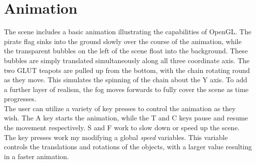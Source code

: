 \documentclass[]{article}
\begin{document}
\section*{Animation}

The scene includes a basic animation illustrating the capabilities of OpenGL. The pirate flag sinks into the ground slowly over the course of the animation, while the transparent bubbles on the left of the scene float into the background. These bubbles are simply translated simultaneously along all three coordinate axis. The two GLUT teapots are pulled up from the bottom, with the chain rotating round as they move. This simulates the spinning of the chain about the Y axis. To add a further layer of realism, the fog moves forwards to fully cover the scene as time progresses.\\

The user can utilize a variety of key presses to control the animation as they wish. The A key starts the animation, while the T and C keys pause and resume the movement respectively. S and F work to slow down or speed up the scene. The key presses work my modifying a global \textit{speed} variables. This variable controls the translations and rotations of the objects, with a larger value resulting in a faster animation.


\break
\setlength{}
\printbibliography

\end{document}
